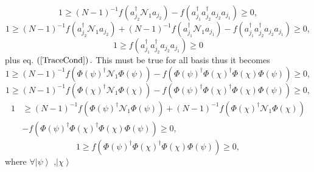 \documentclass[aps,preprint]{revtex4}%
\begin{document}
\begin{equation}
1\geq\left(  N-1\right)  ^{-1}f\left(  a_{j_{2}}^{\dagger}\mathcal{N}%
_{1}a_{j_{2}}\right)  -f\left(  a_{j_{1}}^{\dagger}a_{j_{2}}^{\dagger}%
a_{j_{2}}a_{j_{1}}\right)  \geq0,
\end{equation}%
\begin{equation}
1\geq\left(  N-1\right)  ^{-1}f\left(  a_{j_{2}}^{\dagger}\mathcal{N}%
_{1}a_{j_{2}}\right)  +\left(  N-1\right)  ^{-1}f\left(  a_{j_{1}}^{\dagger
}\mathcal{N}_{1}a_{j_{1}}\right)  -f\left(  a_{j_{1}}^{\dagger}a_{j_{2}%
}^{\dagger}a_{j_{2}}a_{j_{1}}\right)  \geq0,
\end{equation}%
\begin{equation}
1\geq f\left(  a_{j_{1}}^{\dagger}a_{j_{2}}^{\dagger}a_{j_{2}}a_{j_{1}%
}\right)  \geq0
\end{equation}
plus eq. $\left(  \ref{TraceCond}\right)  .$ This must be true for all basis
thus it becomes
\begin{equation}
1\geq\left(  N-1\right)  ^{-1}f\left(  \Phi\left(  \psi\right)  ^{\dagger
}\mathcal{N}_{1}\Phi\left(  \psi\right)  \right)  -f\left(  \Phi\left(
\psi\right)  ^{\dagger}\Phi\left(  \chi\right)  ^{\dagger}\Phi\left(
\chi\right)  \Phi\left(  \psi\right)  \right)  \geq0,
\end{equation}%
\begin{equation}
1\geq\left(  N-1\right)  ^{-1}f\left(  \Phi\left(  \chi\right)  ^{\dagger
}\mathcal{N}_{1}\Phi\left(  \chi\right)  \right)  -f\left(  \Phi\left(
\psi\right)  ^{\dagger}\Phi\left(  \chi\right)  ^{\dagger}\Phi\left(
\chi\right)  \Phi\left(  \psi\right)  \right)  \geq0,
\end{equation}%
\begin{align}
1  &  \geq\left(  N-1\right)  ^{-1}f\left(  \Phi\left(  \psi\right)
^{\dagger}\mathcal{N}_{1}\Phi\left(  \psi\right)  \right)  +\left(
N-1\right)  ^{-1}f\left(  \Phi\left(  \chi\right)  ^{\dagger}\mathcal{N}%
_{1}\Phi\left(  \chi\right)  \right) \\
&  \left.  -\right.  f\left(  \Phi\left(  \psi\right)  ^{\dagger}\Phi\left(
\chi\right)  ^{\dagger}\Phi\left(  \chi\right)  \Phi\left(  \psi\right)
\right)  \geq0,
\end{align}%
\begin{equation}
1\geq f\left(  \Phi\left(  \psi\right)  ^{\dagger}\Phi\left(  \chi\right)
^{\dagger}\Phi\left(  \chi\right)  \Phi\left(  \psi\right)  \right)  \geq0,
\end{equation}
where $\forall\left\vert \psi\right\rangle $ ,$\left\vert \chi\right\rangle $
\end{document}
